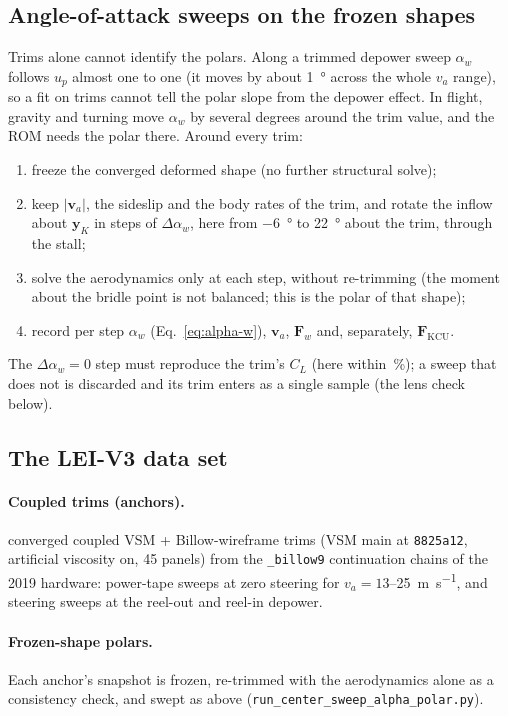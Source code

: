 \documentclass[11pt,a4paper]{article}
\newcommand{\code}[1]{\texttt{\small #1}}
\begin{document}
\subsection{Angle-of-attack sweeps on the frozen shapes}
\label{sec:data-sweeps}
Trims alone cannot identify the polars. Along a trimmed depower sweep
$\alpha_w$ follows $u_p$ almost one to one (it moves by about
\SI{1}{\degree} across the whole $v_a$ range), so a fit on trims cannot tell
the polar slope from the depower effect. In flight, gravity and turning move
$\alpha_w$ by several degrees around the trim value, and the ROM needs the
polar there. Around every trim:
\begin{enumerate}
  \item freeze the converged deformed shape (no further structural solve);
  \item keep $|\mathbf v_a|$, the sideslip and the body rates of the trim, and
        rotate the inflow about $\mathbf y_K$ in steps of $\Delta\alpha_w$, here
        from \SI{-6}{\degree} to \SI{+22}{\degree} about the trim, through
        the stall;
  \item solve the aerodynamics only at each step, without re-trimming (the
        moment about the bridle point is not balanced; this is the polar of
        that shape);
  \item record per step $\alpha_w$ (Eq.~\ref{eq:alpha-w}), $\mathbf v_a$,
        $\mathbf F_w$ and, separately, $\mathbf F_\mathrm{KCU}$.
\end{enumerate}
The $\Delta\alpha_w=0$ step must reproduce the trim's $C_L$ (here within
\lensTolPct\,\%); a sweep that does not is discarded and its trim enters as a
single sample (the lens check below).

\subsection{The LEI-V3 data set}

\paragraph{Coupled trims (anchors).}
\nAnchorsAll{} converged coupled VSM + Billow-wireframe trims (VSM main at
\code{8825a12}, artificial viscosity on, 45 panels) from the \code{\_billow9}
continuation chains of the 2019 hardware: power-tape sweeps at zero steering
for $v_a=13$--\SI{25}{\metre\per\second}, and steering sweeps at the reel-out
and reel-in depower.

\paragraph{Frozen-shape polars.}
Each anchor's snapshot is frozen, re-trimmed with the aerodynamics alone as
a consistency check, and swept as above
(\code{run\_center\_sweep\_alpha\_polar.py}).
\end{document}
